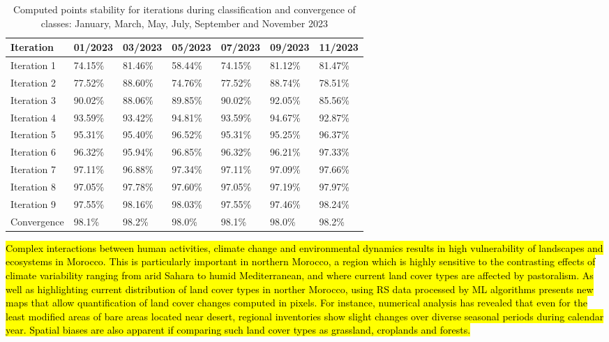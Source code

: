 \documentclass[geomatics,article,submit,pdftex,moreauthors]{Definitions/mdpi}
\begin{document}
\begin{table}[H]
\centering
\begin{tabularx}{\textwidth}{| p{1.7cm} | X | X | X | X | X | X | }
  \toprule
   Iteration & 01/2023 & 03/2023 & 05/2023 & 07/2023 & 09/2023 & 11/2023  \\
   \midrule
    Iteration 1 & 74.15\% & 81.46\% & 58.44\% & 74.15\% & 81.12\% & 81.47\% \\
    Iteration 2 & 77.52\% & 88.60\% & 74.76\% & 77.52\% & 88.74\% & 78.51\% \\
    Iteration 3 & 90.02\% & 88.06\% & 89.85\% & 90.02\% & 92.05\% & 85.56\% \\
    Iteration 4 & 93.59\% & 93.42\% & 94.81\% & 93.59\% & 94.67\% & 92.87\% \\
    Iteration 5 & 95.31\% & 95.40\% & 96.52\% & 95.31\% & 95.25\% & 96.37\% \\
    Iteration 6 & 96.32\% & 95.94\% & 96.85\% & 96.32\% & 96.21\% & 97.33\% \\
    Iteration 7 & 97.11\% & 96.88\% & 97.34\% & 97.11\% & 97.09\% & 97.66\% \\
    Iteration 8 & 97.05\% & 97.78\% & 97.60\% & 97.05\% & 97.19\% & 97.97\% \\
    Iteration 9 & 97.55\% & 98.16\% & 98.03\% & 97.55\% & 97.46\% & 98.24\% \\
    \midrule
    Convergence & 98.1\% & 98.2\% & 98.0\% & 98.1\% & 98.0\% & 98.2\% \\
    \bottomrule
\end{tabularx}
\caption{Computed points stability for iterations during classification and convergence of classes: January, March, May, July, September and November 2023}\label{tabA06}
\end{table}

\hl{Complex interactions between human activities, climate change and environmental dynamics results in high vulnerability of landscapes and ecosystems in Morocco. This is particularly important in northern Morocco, a region which is highly sensitive to the contrasting effects of climate variability ranging from arid Sahara to humid Mediterranean, and where current land cover types are affected by pastoralism. As well as highlighting current distribution of land cover types in norther Morocco, using RS data processed by ML algorithms presents new maps that allow quantification of land cover changes computed in pixels. For instance, numerical analysis has revealed that even for the least modified areas of bare areas located near desert, regional inventories show slight changes over diverse seasonal periods during calendar year. Spatial biases are also apparent if comparing such land cover types as grassland, croplands and forests.}
\end{document}
